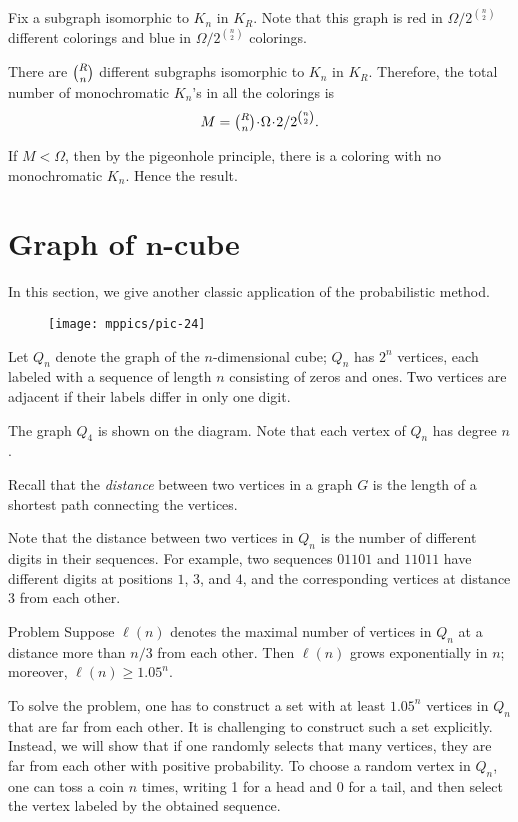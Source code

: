 Fix a subgraph isomorphic to $K_n$ in $K_R$.
Note that this graph is red in $\Omega/2^{\binom n2}$ different colorings
and blue in $\Omega/2^{\binom n2}$ colorings.

There are $\tbinom Rn$ different subgraphs isomorphic to $K_n$ in $K_R$.
Therefore, the total number of monochromatic $K_n$'s in all the colorings 
is 
\[M=\tbinom Rn\cdot\Omega\cdot  2/2^{\binom n2}.\]

If $M<\Omega$, then by the pigeonhole principle,
there is a coloring with no monochromatic $K_n$.
Hence the result.
\qeds

\section[\texorpdfstring{Graph of $n$-cube}{Graph of n-cube}]{Graph of $\bm{n}$-cube}

In this section, we give another classic application of the probabilistic method.

\begin{wrapfigure}{o}{25mm}
\vskip-0mm
\centering
\texttt{[image: mppics/pic-24]}
\vskip-0mm
\end{wrapfigure}

Let $Q_n$ denote the graph of the $n$-dimensional cube;
$Q_n$ has $2^n$ vertices, each labeled with a sequence of length $n$ consisting  of zeros and ones.
Тwo vertices are adjacent if their labels differ in only one digit.

The graph $Q_4$ is shown on the diagram.
Note that each vertex of $Q_n$ has degree $n$.

Recall that the \emph{distance} between two vertices in a graph $G$ is the length of a shortest path connecting the vertices.

Note that the distance between two vertices in $Q_n$ is the number of different digits in their sequences.
For example, two sequences $01101$ and $11011$ have different digits at positions $1$, $3$, and $4$,
and the corresponding vertices at distance $3$ from each other.


\begin{thm}{Problem}\label{prob:Qn}
Suppose $\ell(n)$ denotes the maximal number of vertices in $Q_n$ at a distance more than $n/3$ from each other.
Then $\ell(n)$ grows exponentially in $n$;
moreover, $\ell(n)\ge 1.05^n$. 
\end{thm}

To solve the problem, one has to construct a set with at least $1.05^n$ vertices in $Q_n$ that are far from each other.
It is challenging to construct such a set explicitly.
Instead, we will show that 
if one randomly selects that many vertices, they are far from each other with positive probability.
To choose a random vertex in $Q_n$, one can toss a coin $n$ times, writing 1 for a head and 0 for a tail, and then select the vertex labeled by the obtained sequence.

